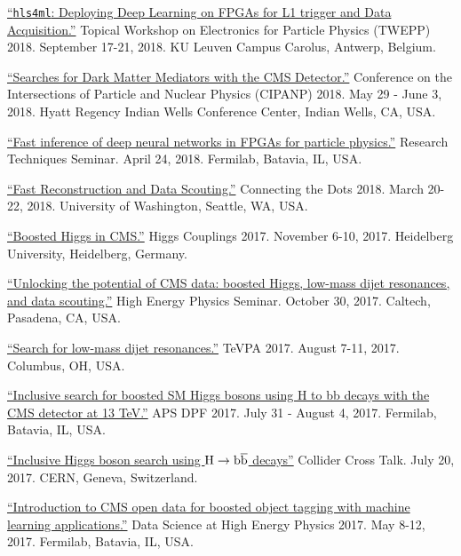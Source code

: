 \documentclass[11pt]{res}
\begin{document}
\begin{resume}
\href{https://indico.cern.ch/event/697988/contributions/3055990/}{``\texttt{hls4ml}:
    Deploying Deep Learning on FPGAs for L1 trigger and Data
    Acquisition.''} Topical Workshop on Electronics for
  Particle Physics (TWEPP) 2018. September 17-21, 2018. KU Leuven Campus Carolus, Antwerp, Belgium.

\href{https://conferences.lbl.gov/event/137/session/27/contribution/354}{``Searches
    for Dark Matter Mediators with the CMS Detector.''} Conference on the Intersections of Particle and Nuclear
  Physics (CIPANP) 2018. May 29 - June 3, 2018. Hyatt Regency Indian Wells
  Conference Center, Indian Wells, CA, USA.

\href{https://indico.fnal.gov/event/16908/}{``Fast inference of deep neural networks in FPGAs for particle physics.''} Research Techniques Seminar. April 24, 2018. Fermilab, Batavia, IL, USA.

\href{https://indico.cern.ch/event/658267/contributions/2881127/}{``Fast Reconstruction and Data Scouting.''} Connecting the Dots 2018. March 20-22,
  2018. University of Washington, Seattle, WA, USA.

\href{http://www.thphys.uni-heidelberg.de/~higgs/talks/duarte.pdf}{``Boosted Higgs in CMS.''} Higgs Couplings 2017. November 6-10, 2017. Heidelberg
  University, Heidelberg, Germany.

\href{https://indico.hep.caltech.edu/indico/conferenceDisplay.py?confId=149}{``Unlocking the potential of CMS data: boosted Higgs, low-mass dijet resonances, and data scouting.''} High Energy Physics Seminar. October 30, 2017. Caltech, Pasadena, CA, USA.

\href{https://indico.cern.ch/event/615891/contributions/2666361/}{``Search
    for low-mass dijet resonances.''} TeVPA 2017. August 7-11,
  2017. Columbus, OH, USA.

\href{https://indico.fnal.gov/contributionDisplay.py?sessionId=14&contribId=38&confId=11999}{``Inclusive
  search for boosted SM Higgs bosons using H to bb decays with the CMS
  detector at 13 TeV.''} APS DPF 2017.  July
  31 - August 4, 2017. Fermilab, Batavia, IL, USA.

\href{https://indico.cern.ch/event/649575/}{``Inclusive
    Higgs boson search using $\mathrm{H}\to\mathrm{b}\overline{\mathrm{b}}$ decays''} Collider Cross
  Talk. July 20, 2017. CERN, Geneva, Switzerland.

\href{https://indico.fnal.gov/contributionDisplay.py?sessionId=6&contribId=54&confId=13497}{``Introduction
    to CMS open data for boosted object tagging with machine learning
    applications.''} Data Science at High Energy Physics 2017. May
  8-12, 2017. Fermilab, Batavia, IL, USA.


\end{resume}
\end{document}
